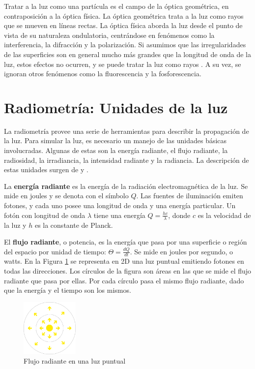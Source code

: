 Tratar a la luz como una partícula es el campo de la óptica geométrica, en contraposición a la óptica física.
La óptica geométrica trata a la luz como rayos que se mueven en líneas rectas.
La óptica física aborda la luz desde el punto de vista de su naturaleza ondulatoria, centrándose en fenómenos como la interferencia, la difracción y la polarización.
Si asumimos que las irregularidades de las superficies son en general mucho más grandes que la longitud de onda de la luz, estos efectos no ocurren, y se puede tratar la luz como rayos \cite[p.~303]{rtr}.
A su vez, se ignoran otros fenómenos como la fluorescencia y la fosforescencia.


\section{Radiometría: Unidades de la luz}\label{sec:radiometry}

La radiometría provee una serie de herramientas para describir la propagación de la luz.
Para simular la luz, es necesario un manejo de las unidades básicas involucradas.
Algunas de estas son la energía radiante, el flujo radiante, la radiosidad, la irradiancia, la intensidad radiante y la radiancia.
La descripción de estas unidades surgen de \cite[p.~268]{rtr} y \cite[p.~177]{pbr}.

La \textbf{energía radiante} es la energía de la radiación electromagnética de la luz.
Se mide en joules y se denota con el símbolo $Q$.
Las fuentes de iluminación emiten fotones, y cada uno posee una longitud de onda y una energía particular.
Un fotón con longitud de onda $\lambda$ tiene una energía $Q = \frac{hc}{\lambda}$, donde $c$ es la velocidad de la luz y $h$ es la constante de Planck.

El \textbf{flujo radiante}, o potencia, es la energía que pasa por una superficie o región del espacio por unidad de tiempo: $\Theta = \frac{dQ}{dt}$.
Se mide en joules por segundo, o watts.
En la Figura \ref{fig:point-light-flux} se representa en 2D una luz puntual emitiendo fotones en todas las direcciones.
Los círculos de la figura son áreas en las que se mide el flujo radiante que pasa por ellas.
Por cada círculo pasa el mismo flujo radiante, dado que la energía y el tiempo son los mismos.

\begin{figure}[ht]
    \centering
    \includegraphics[width=0.25\textwidth]{point-light-flux.png}
    \caption{Flujo radiante en una luz puntual}
    \label{fig:point-light-flux}
\end{figure}


